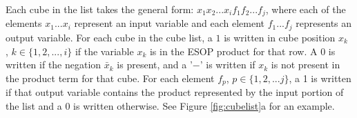Each cube in the list takes the general form: $x_{1} x_{2} ... x_{i} f_{1} f_{2} ... f_{j}$, where each of the elements $x_{1} ... x_{i}$ 
represent an input variable and each element $f_{1} ... f_{j}$ represents an output variable. For each cube in the 
cube list, a $1$ is written in cube position $x_{k}$ , $k \in \{1,2, ..., i\}$ if the variable $x_{k}$ is in 
the ESOP product for that row. A $0$ is written if the negation $\bar{x}_{k}$ is present, and a '$-$' is written if $x_{k}$ is not present in the
product term for that cube. For each element $f_{p}$, $p \in \{1,2,...j\}$, a 1 is written if that output variable contains 
the product represented by the input portion of the list and a 0 is written otherwise. See Figure \ref{fig:cubelist}a for 
an example. \\
